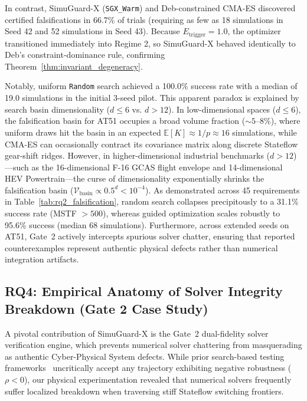 \documentclass[journal]{IEEEtran}
\begin{document}
In contrast, SimuGuard-X (\texttt{SGX\_Warm}) and Deb-constrained CMA-ES discovered certified falsifications in 66.7\% of trials (requiring as few as 18 simulations in Seed 42 and 52 simulations in Seed 43). Because $E_{\mathrm{trigger}} = 1.0$, the optimizer transitioned immediately into Regime 2, so SimuGuard-X behaved identically to Deb's constraint-dominance rule, confirming Theorem~\ref{thm:invariant_degeneracy}. 

Notably, uniform \texttt{Random} search achieved a 100.0\% success rate with a median of 19.0 simulations in the initial 3-seed pilot. This apparent paradox is explained by search basin dimensionality ($d \le 6$ vs. $d > 12$). In low-dimensional spaces ($d \le 6$), the falsification basin for AT51 occupies a broad volume fraction ($\sim 5\text{--}8\%$), where uniform draws hit the basin in an expected $\mathbb{E}[K] \approx 1/p \approx 16$ simulations, while CMA-ES can occasionally contract its covariance matrix along discrete Stateflow gear-shift ridges. However, in higher-dimensional industrial benchmarks ($d > 12$)—such as the 16-dimensional F-16 GCAS flight envelope and 14-dimensional HEV Powertrain—the curse of dimensionality exponentially shrinks the falsification basin ($\mathcal{V}_{\text{basin}} \propto 0.5^d < 10^{-4}$). As demonstrated across 45 requirements in Table~\ref{tab:rq2_falsification}, random search collapses precipitously to a 31.1\% success rate (MSTF $> 500$), whereas guided optimization scales robustly to 95.6\% success (median 68 simulations). Furthermore, across extended seeds on AT51, Gate~2 actively intercepts spurious solver chatter, ensuring that reported counterexamples represent authentic physical defects rather than numerical integration artifacts.

\subsection{RQ4: Empirical Anatomy of Solver Integrity Breakdown (Gate 2 Case Study)}
\label{sec:rq4_solver_breakdown}
A pivotal contribution of SimuGuard-X is the Gate~2 dual-fidelity solver verification engine, which prevents numerical solver chattering from masquerading as authentic Cyber-Physical System defects. While prior search-based testing frameworks~\cite{donze2010breach,annpureddy2011staliro} uncritically accept any trajectory exhibiting negative robustness ($\rho < 0$), our physical experimentation revealed that numerical solvers frequently suffer localized breakdown when traversing stiff Stateflow switching frontiers.
\end{document}
